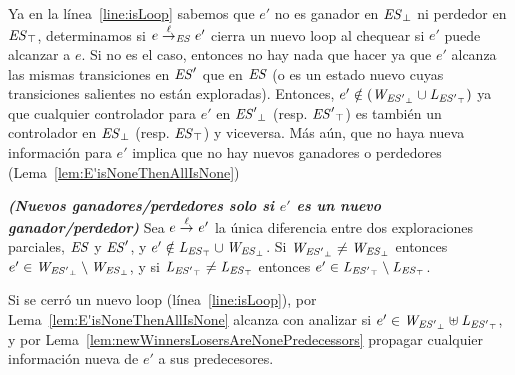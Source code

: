 Ya en la línea~\ref{line:isLoop} sabemos que $e'$ no es ganador en $\mathit{{\mathit{ES}}_{\bot}}$ ni perdedor en $\mathit{{\mathit{ES}}_{\top}}$, determinamos si $e 
\overset{\ell}{\rightarrow}_{\mathit{ES}} e'$ cierra un nuevo loop al chequear si $e'$ puede alcanzar a $e$. Si no es el caso, entonces no hay nada que hacer ya que $e'$ alcanza las mismas transiciones en $\mathit{ES}'$ que en $\mathit{ES}$ (o es un estado nuevo cuyas transiciones salientes no están exploradas). Entonces, $e' \notin 
(\mathit{W_{\mathit{{\mathit{ES}'}_{\bot}}}} \cup \mathit{L_{\mathit{{\mathit{ES}'}_{\top}}}})$ ya que cualquier controlador para $e'$ en $\mathit{{\mathit{ES}'}_{\bot}}$ (resp. $\mathit{{\mathit{ES}'}_{\top}}$) es también un controlador en $\mathit{{\mathit{ES}}_{\bot}}$ (resp. 
$\mathit{{\mathit{ES}}_{\top}}$) y viceversa.
%
%
Más aún, que no haya nueva información para $e'$ implica que no hay nuevos ganadores o perdedores (Lema~\ref{lem:E'isNoneThenAllIsNone})

\begin{lemma}\textbf{\emph{(Nuevos ganadores/perdedores solo si $e'$ es un nuevo ganador/perdedor)}}
\label{lem:E'isNoneThenAllIsNone}
Sea $e \overset{\ell}{\rightarrow}_{} e'$ la única diferencia entre dos exploraciones parciales, $\mathit{ES}$ y $\mathit{ES}'$, y $e' \notin \mathit{L_{\mathit{{\mathit{ES}}_{\top}}}} \cup \mathit{W_{\mathit{{\mathit{ES}}_{\bot}}}}$. Si $\mathit{W_{\mathit{{\mathit{ES}'}_{\bot}}}} \neq \mathit{W_{\mathit{{\mathit{ES}}_{\bot}}}}$ entonces $e' \in \mathit{W_{\mathit{{\mathit{ES}'}_{\bot}}}} \setminus \mathit{W_{\mathit{{\mathit{ES}}_{\bot}}}}$, y si $\mathit{L_{\mathit{{\mathit{ES}'}_{\top}}}} \neq \mathit{L_{\mathit{{\mathit{ES}}_{\top}}}} $ entonces $e' \in \mathit{L_{\mathit{{\mathit{ES}'}_{\top}}}} \setminus \mathit{L_{\mathit{{\mathit{ES}}_{\top}}}}$.
\end{lemma}


Si se cerró un nuevo loop (línea~\ref{line:isLoop}), por Lema~\ref{lem:E'isNoneThenAllIsNone} alcanza con analizar si $e' 
\in \mathit{W_{\mathit{{\mathit{ES}'}_{\bot}}}} \uplus \mathit{L_{\mathit{{\mathit{ES}'}_{\top}}}}$, y por Lema~\ref{lem:newWinnersLosersAreNonePredecessors} propagar cualquier información nueva de $e'$ a sus predecesores. 

